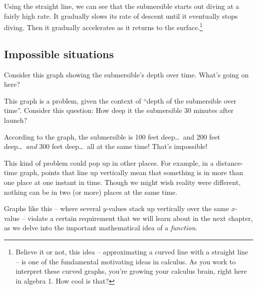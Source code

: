 Using the straight line, we can see that the submersible starts out diving at a fairly high rate. It gradually slows its rate of descent until it eventually stops diving. Then it gradually accelerates as it returns to the surface.\footnote{Believe it or not, this idea -- approximating a curved line with a straight line -- is one of the fundamental motivating ideas in calculus. As you work to interpret these curved graphs, you're growing your calculus brain, right here in algebra 1. How cool is that?}

\subsection{Impossible situations}

Consider this graph showing the submersible's depth over time. What's going on here?

\begin{figure}
\end{figure}

This graph is a problem, given the context of ``depth of the submersible over time''. Consider this question: How deep it the submersible 30 minutes after launch?

According to the graph, the submersible is 100 feet deep\ldots\ and 200 feet deep\ldots\ \textit{and} 300 feet deep\ldots\ all at the same time! That's impossible!

This kind of problem could pop up in other places. For example, in a distance-time graph, points that line up vertically mean that something is in more than one place at one instant in time. Though we might wish reality were different, nothing can be in two (or more) places at the same time.

Graphs like this -- where several $y$-values stack up vertically over the same $x$-value -- violate a certain requirement that we will learn about in the next chapter, as we delve into the important mathematical idea of a \textit{function}.
